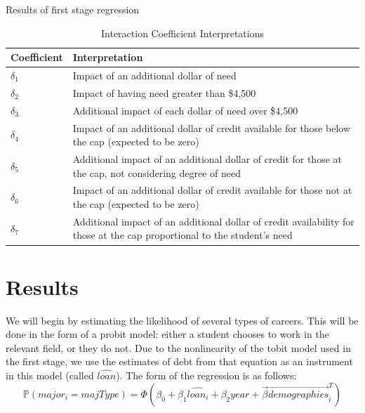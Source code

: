 \documentclass[12pt]{article}
\newcommand{\regs}{../Analysis/Regressions/Output/}
\begin{document}
	 \begin{table}
	 	\centering
	 	\caption{Results of first stage regression}	 
	 	\resizebox{\textwidth}{!}{	
		 	
		 }
	 	\label{firststage}
	 \end{table}
	
	\begin{table}
		\centering
		\caption{Interaction Coefficient Interpretations}		
		\begin{tabular}{lp{8cm}}
			\toprule
			Coefficient & Interpretation\\
			\midrule
			$\delta_1$ & Impact of an additional dollar of need\\
			$\delta_2$ & Impact of having need greater than \$4,500 \\
			$\delta_3$ & Additional impact of each dollar of need over \$4,500 \\
			$\delta_4$ & Impact of an additional dollar of credit available for those below the cap (expected to be zero)\\
			$\delta_5$ & Additional impact of an additional dollar of credit for those at the cap, not considering degree of need\\
			$\delta_6$ & Impact of an additional dollar of credit available for those not at the cap (expected to be zero)\\
			$\delta_7$ & Additional impact of an additional dollar of credit availability for those at the cap proportional to the student's need \\
			\bottomrule
		\end{tabular}
	
		\label{coefInterp}
	\end{table}
	
	
	\section{Results}
	
	We will begin by estimating the likelihood of several types of careers. This will be done in the form of a probit model: either a student chooses to work in the relevant field, or they do not. Due to the nonlinearity of the tobit model used in the first stage, we use the estimates of debt from that equation as an instrument in this model (called $\hat{loan}$). The form of the regression is as follows: $$\mathbb{P}\left(major_i = majType\right) = \Phi\left(\beta_0 + \beta_1 \hat{loan_i} + \beta_2 year + \vec{\beta}\vec{demographics}^T_i\right)$$
	
\end{document}
